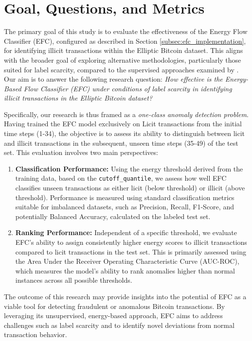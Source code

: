 \documentclass[12pt]{article}
\begin{document}
\section{Goal, Questions, and Metrics} \label{subsec:task}
The primary goal of this study is to evaluate the effectiveness of the Energy Flow Classifier (EFC), configured
as described in Section \ref{subsec:efc_implementation}, for identifying illicit transactions within the Elliptic
Bitcoin dataset. This aligns with the broader goal of exploring alternative methodologies, particularly those suited for
label scarcity, compared to the supervised approaches examined by \cite{lorenz2021machinelearningmethodsdetect}. Our aim
is to answer the following research question: \emph{How effective is the Energy-Based Flow Classifier (EFC) under conditions
of label scarcity in identifying illicit transactions in the Elliptic Bitcoin dataset?}

Specifically, our research is thus framed as a \emph{one-class anomaly detection problem}. Having trained the EFC model exclusively
on Licit transactions from the initial time steps (1-34), the objective is to assess its ability to distinguish between
licit and illicit transactions in the subsequent, unseen time steps (35-49) of the test set. This evaluation involves
two main perspectives:

\begin{enumerate}
    \item \textbf{Classification Performance:} Using the energy threshold derived from the training data, based on the
      \texttt{cutoff\_quantile}, we assess how well EFC classifies unseen transactions as either licit (below threshold)
      or illicit (above threshold). Performance is measured using standard classification metrics suitable for imbalanced
      datasets, such as Precision, Recall, F1-Score, and potentially Balanced Accuracy, calculated on the labeled test set.
      
    \item \textbf{Ranking Performance:} Independent of a specific threshold, we evaluate EFC's ability to assign consistently
      higher energy scores to illicit transactions compared to licit transactions in the test set. This is primarily
      assessed using the Area Under the Receiver Operating Characteristic Curve (AUC-ROC), which measures the model's
      ability to rank anomalies higher than normal instances across all possible thresholds.
\end{enumerate}

The outcome of this research may provide insights into the potential of EFC as a viable tool for detecting fraudulent or
anomalous Bitcoin transactions. By leveraging its unsupervised, energy-based approach, EFC aims to address challenges such
as label scarcity and to identify novel deviations from normal transaction behavior.
\end{document}
